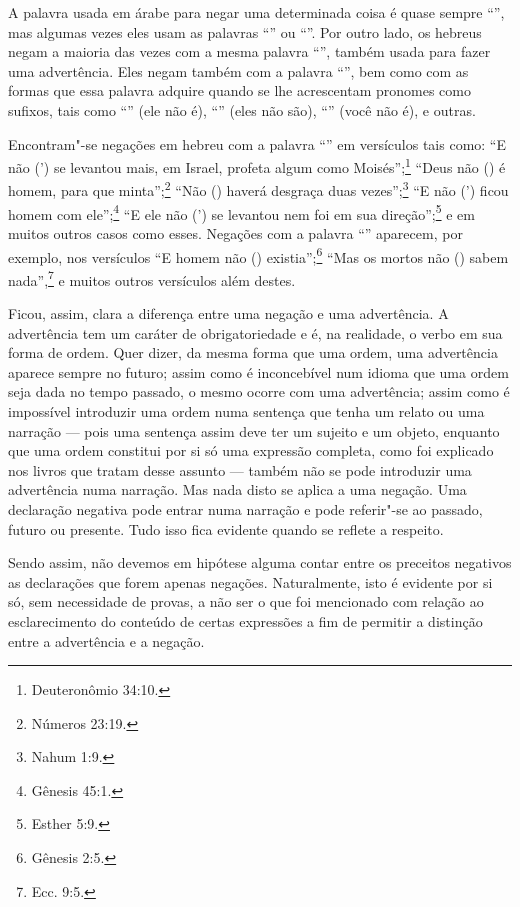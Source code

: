 A palavra usada em árabe para negar uma determinada coisa é quase sempre
``'', mas algumas vezes eles usam as palavras ``'' ou ``''. Por
outro lado, os hebreus negam a maioria das vezes com a mesma palavra
``'', também usada para fazer uma advertência. Eles negam também com a
palavra ``'', bem como com as formas que essa palavra adquire quando
se lhe acrescentam pronomes como sufixos, tais como ``'' (ele não
é), ``'' (eles não são), ``'' (você não é), e outras.

Encontram"-se negações em hebreu com a palavra ``'' em versículos tais
como: ``E não (') se levantou mais, em Israel, profeta algum como
Moisés'';\footnote{Deuteronômio 34:10.} ``Deus não () é homem, para que minta'';\footnote{Números 23:19.} ``Não () haverá desgraça duas vezes'';\footnote{Nahum 1:9.}
``E não (') ficou homem com ele'';\footnote{Gênesis 45:1.} ``E ele não
(') se levantou nem foi em sua direção'';\footnote{Esther 5:9.} e em muitos
outros casos como esses. Negações com a palavra ``'' aparecem, por
exemplo, nos versículos ``E homem não () existia'';\footnote{Gênesis 2:5.} ``Mas os mortos não ()
sabem nada'',\footnote{Ecc. 9:5.} e muitos outros versículos além destes.

Ficou, assim, clara a diferença entre uma negação e uma advertência. A
advertência tem um caráter de obrigatoriedade e é, na realidade, o verbo
em sua forma de ordem. Quer dizer, da mesma forma que uma ordem, uma
advertência aparece sempre no futuro; assim como é inconcebível num
idioma que uma ordem seja dada no tempo passado, o mesmo ocorre com uma
advertência; assim como é impossível introduzir uma ordem numa sentença
que tenha um relato ou uma narração --- pois uma sentença assim deve
ter um sujeito e um objeto, enquanto que uma ordem constitui por si só
uma expressão completa, como foi explicado nos livros que tratam desse
assunto --- também não se pode introduzir uma advertência numa narração.
Mas nada disto se aplica a uma negação. Uma declaração negativa pode
entrar numa narração e pode referir"-se ao passado, futuro ou presente.
Tudo isso fica evidente quando se reflete a respeito.

Sendo assim, não devemos em hipótese alguma contar entre os preceitos
negativos as declarações que forem apenas negações. Naturalmente, isto é
evidente por si só, sem necessidade de provas, a não ser o que foi
mencionado com relação ao esclarecimento do conteúdo de certas
expressões a fim de permitir a distinção entre a advertência e a
negação.

